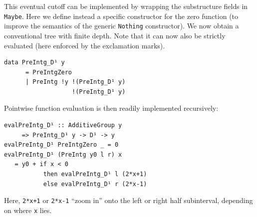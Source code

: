 \documentclass[final,sigplan,review,anonymous]{acmart}\settopmatter{printfolios=true,printccs=false,printacmref=false}
\theoremstyle{acmplain}
\theoremstyle{acmdefinition}
\begin{document}
This eventual cutoff can be implemented by wrapping the substructure fields in \lstinline`Maybe`.
Here we define instead a specific constructor for the zero function (to improve the semantics of the generic \lstinline`Nothing` constructor).
We now obtain a conventional tree with finite depth.
Note that it can now also be strictly evaluated (here enforced by the exclamation marks).
\begin{lstlisting}
data PreIntg_D¹ y
      = PreIntgZero
      | PreIntg !y !(PreIntg_D¹ y)
                   !(PreIntg_D¹ y)
\end{lstlisting}
Pointwise function evaluation is then readily implemented recursively:
\begin{lstlisting}
evalPreIntg_D¹ :: AdditiveGroup y
     => PreIntg_D¹ y -> D¹ -> y
evalPreIntg_D¹ PreIntgZero _ = 0
evalPreIntg_D¹ (PreIntg y0 l r) x
   = y0 + if x < 0
           then evalPreIntg_D¹ l (2*x+1)
           else evalPreIntg_D¹ r (2*x-1)
\end{lstlisting}
Here, \lstinline`2*x+1` or \lstinline`2*x-1` “zoom in” onto the left or right half subinterval, depending on where \lstinline`x` lies.
\end{document}
